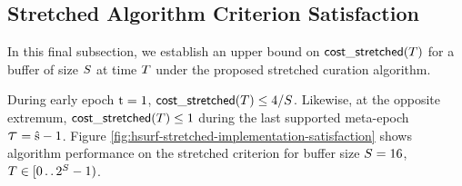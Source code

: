 \subsection{Stretched Algorithm Criterion Satisfaction}
\label{sec:stretched-satisfaction}

In this final subsection, we establish an upper bound on $\mathsf{cost\_stretched}(\colorT)$ for a buffer of size $\colorS$ at time $\colorT$ under the proposed stretched curation algorithm.



During early epoch $\colort = 1$, $\mathsf{cost\_stretched}(\colorT) \leq 4/\colorS$.
Likewise, at the opposite extremum, $\mathsf{cost\_stretched}(\colorT) \leq 1$ during the last supported meta-epoch $\colortau = \colors - 1$.
Figure \ref{fig:hsurf-stretched-implementation-satisfaction} shows algorithm performance on the stretched criterion for buffer size $\colorS=16$, $\colorT \in [0\twodots 2^{\colorS} - 1)$.
